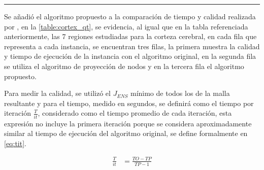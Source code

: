 \vspace{4pt}
\hrule
\vspace{4pt}

Se añadió el algoritmo propuesto a la comparación de tiempo y calidad realizada por \cite{daines2018repairing}, en la \autoref{table:cortex_qt}, se evidencia, al igual que en la tabla referenciada anteriormente, las 7 regiones estudiadas para la corteza cerebral, en cada fila que representa a cada instancia, se encuentran tres filas, la primera muestra la calidad y tiempo de ejecución de la instancia con el algoritmo original, en la segunda fila se utiliza el algoritmo de proyección de nodos y en la tercera fila el algoritmo propuesto.

Para medir la calidad, se utilizó el $J_{ENS}$ mínimo de todos los \elements{} de la malla resultante y para el tiempo, medido en segundos, se definirá como el tiempo por iteración $\frac{T}{it}$, considerado como el tiempo promedio de cada iteración, esta expresión no incluye la primera iteración porque se considera aproximadamente similar al tiempo de ejecución del algoritmo original, se define formalmente en \autoref{eq:tit}.

 
\begin{equation} \label{eq:tit}
	\begin{aligned}
		\frac{T}{it} &= \frac{TO - TP}{TP - 1}
	\end{aligned}
\end{equation}
 
